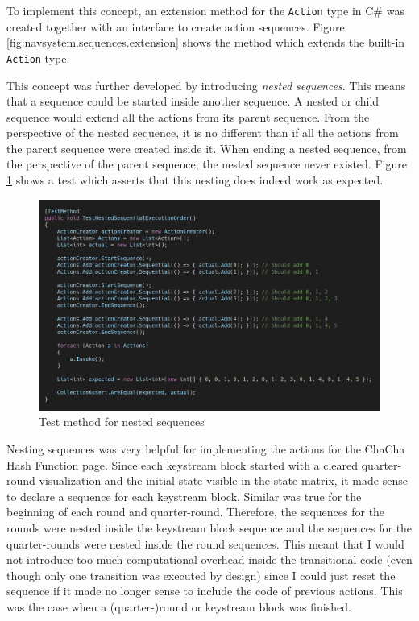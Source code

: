 To implement this concept, an extension method for the \texttt{Action} type in C\# was created together with an interface to create action sequences. Figure \ref{fig:navsystem.sequences.extension} shows the method which extends the built-in \texttt{Action} type.

This concept was further developed by introducing \textit{nested sequences}. This means that a sequence could be started inside another sequence. A nested or child sequence would extend all the actions from its parent sequence. From the perspective of the nested sequence, it is no different than if all the actions from the parent sequence were created inside it. When ending a nested sequence, from the perspective of the parent sequence, the nested sequence never existed. Figure \ref{fig:navsystem.test} shows a test which asserts that this nesting does indeed work as expected.
\begin{figure}
\centering
\includegraphics[width=\textwidth]{figures/code/nav-arch/TestNestedSequentialExecutionOrder.png}
\caption{Test method for nested sequences}
\label{fig:navsystem.test}
\end{figure}

Nesting sequences was very helpful for implementing the actions for the ChaCha Hash Function page. Since each keystream block started with a cleared quarter-round visualization and the initial state visible in the state matrix, it made sense to declare a sequence for each keystream block. Similar was true for the beginning of each round and quarter-round. Therefore, the sequences for the rounds were nested inside the keystream block sequence and the sequences for the quarter-rounds were nested inside the round sequences. This meant that I would not introduce too much computational overhead inside the transitional code (even though only one transition was executed by design) since I could just reset the sequence if it made no longer sense to include the code of previous actions. This was the case when a (quarter-)round or keystream block was finished.

